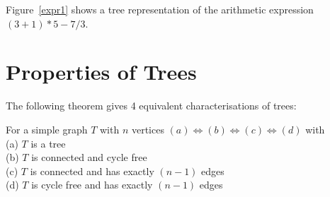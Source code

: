 Figure~\ref{expr1} shows a tree representation of the arithmetic
expression $(3+1) *5 - 7/3$.

\section{Properties of Trees}

The following theorem gives 4 equivalent characterisations of trees:

 \begin{theorem}
For a simple graph $T$ with $n$ vertices
 $(a) \Leftrightarrow
  (b) \Leftrightarrow (c) \Leftrightarrow (d)$ with \\[2mm]
(a) $T$ is a tree\\
(b) $T$ is connected and cycle free\\
(c) $T$ is connected and has exactly $(n-1)$ edges\\
(d) $T$ is cycle free and has exactly $(n-1)$ edges
\end{theorem}

